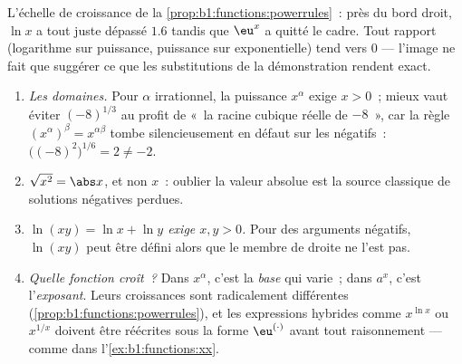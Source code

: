 \begin{omfigure}

{\small L'échelle de croissance de la
\cref{prop:b1:functions:powerrules}~: près du bord droit, $\ln x$
a tout juste dépassé $1.6$ tandis que $\eu^x$ a quitté le cadre. Tout
rapport (logarithme sur puissance, puissance sur exponentielle) tend
vers $0$ --- l'image ne fait que suggérer ce que les substitutions de
la démonstration rendent exact.}
\end{omfigure}

\begin{remark}\label{rem:b1:functions:pitfalls}
\begin{enumerate}
  \item \emph{Les domaines.} Pour $\alpha$ irrationnel, la puissance
        $x^\alpha$ exige $x > 0$~; mieux vaut éviter $(-8)^{1/3}$ au profit de
        «~la racine cubique réelle de $-8$~», car la règle
        $(x^\alpha)^\beta = x^{\alpha\beta}$ tombe silencieusement en
        défaut sur les négatifs~:
        $\bigl((-8)^2\bigr)^{1/6} = 2 \neq -2$.
  \item \emph{$\sqrt{x^2} = \abs x$}, et non $x$~: oublier la valeur
        absolue est la source classique de solutions négatives
        perdues.
  \item \emph{$\ln(xy) = \ln x + \ln y$ exige $x, y > 0$.} Pour des
        arguments négatifs, $\ln(xy)$ peut être défini alors que le
        membre de droite ne l'est pas.
  \item \emph{Quelle fonction croît~?} Dans $x^\alpha$, c'est la
        \emph{base} qui varie~; dans $a^x$, c'est l'\emph{exposant}.
        Leurs croissances sont radicalement différentes
        (\cref{prop:b1:functions:powerrules}), et les expressions
        hybrides comme $x^{\ln x}$ ou $x^{1/x}$ doivent être
        réécrites sous la forme $\eu^{(\cdot)}$ avant tout
        raisonnement --- comme dans l'\cref{ex:b1:functions:xx}.
\end{enumerate}
\end{remark}

